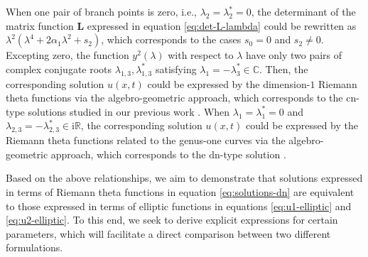 \documentclass[11pt,reqno]{amsart}
\newcommand{\ii}{\mathrm{i}}
\newcommand{\cn}{\mathrm{cn}}
\newcommand{\dn}{\mathrm{dn}}
\numberwithin{equation}{section}
\begin{document}
When one pair of branch points is zero, i.e., $\lambda_2=\lambda_2^*=0$, the determinant of the matrix function $\mathbf{L}$ expressed in equation \eqref{eq:det-L-lambda} could be rewritten as $\lambda^2\left(\lambda^4+2\alpha_1 \lambda^2+s_2\right)$, which corresponds to the cases $s_0=0$ and $s_2\neq 0$.
Excepting zero, the function $y^2(\lambda)$ with respect to $\lambda$ have only two pairs of complex conjugate roots $\lambda_{1,3},\lambda_{1,3}^*$ satisfying $\lambda_1=-\lambda_3^*\in \mathbb{C}$. 
Then, the corresponding solution $u(x,t)$ could be expressed by the dimension-$1$ Riemann theta functions via the algebro-geometric approach, which corresponds to the $\cn$-type solutions studied in our previous work \cite{LingS-23-mKdV-stability}.  When $\lambda_1=\lambda_1^*=0$ and $\lambda_{2,3}=-\lambda_{2,3}^*\in \ii \mathbb{R}$,  the corresponding solution $u(x,t)$ could be expressed by the Riemann theta functions related to the genus-one curves via the algebro-geometric approach, which corresponds to the $\dn$-type solution \cite{LingS-23-mKdV-stability}.


Based on the above relationships, we aim to demonstrate that solutions expressed in terms of Riemann theta functions in equation \eqref{eq:solutions-dn} are equivalent to those expressed in terms of elliptic functions in equations \eqref{eq:u1-elliptic} and \eqref{eq:u2-elliptic}. 
To this end, we seek to derive explicit expressions for certain parameters, which will facilitate a direct comparison between two different formulations.
\end{document}
